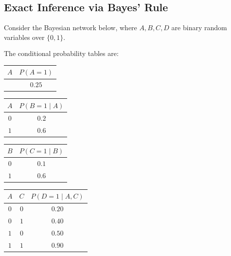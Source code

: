 \subsection{\points[8] Exact Inference via Bayes' Rule}
Consider the Bayesian network below, where $A, B, C, D$ are binary random variables over
$\{0,1\}$.
\begin{figure}[H]
\centering
{}
\end{figure}
\noindent The conditional probability tables are:
\begin{table}[H]
\centering
\begin{tabular}{|c|c|}
\hline
$A$ & $P(A=1)$ \\\hline
    & $0.25$   \\\hline
\end{tabular}
\hspace{8mm}
\begin{tabular}{|c|c|}
\hline
$A$ & $P(B=1\mid A)$ \\\hline
$0$ & $0.2$          \\\hline
$1$ & $0.6$          \\\hline
\end{tabular}
\hspace{8mm}
\begin{tabular}{|c|c|}
\hline
$B$ & $P(C=1\mid B)$ \\\hline
$0$ & $0.1$          \\\hline
$1$ & $0.6$          \\\hline
\end{tabular}
\end{table}
\begin{table}[H]
\centering
\begin{tabular}{|c|c|c|}
\hline
$A$ & $C$ & $P(D=1\mid A,C)$ \\\hline
$0$ & $0$ & $0.20$           \\\hline
$0$ & $1$ & $0.40$           \\\hline
$1$ & $0$ & $0.50$           \\\hline
$1$ & $1$ & $0.90$           \\\hline
\end{tabular}
\end{table}
